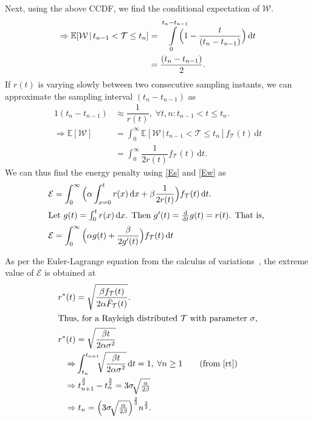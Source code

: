Next, using the above \ac{CCDF}, we find the conditional expectation of $\mathcal{W}$.
\begin{alignat*}{1}
\Rightarrow \mathbb{E}[\mathcal{W}\,|\,t_{n-1}<\mathcal{T}\leq t_n]&=\smashoperator[r]{\int_{0}^{t_n-t_{n-1}}}\Big(1-\dfrac{t}{(t_{n}-t_{n-1})}\Big)\,\mathrm{d}t\\
&=\dfrac{(t_n-t_{n-1})}{2}.
\end{alignat*}
If $r(t)$ is varying slowly between two consecutive sampling instants, we can approximate the sampling interval $(t_n\!-\!t_{n-1})$ as
\begin{alignat}{1}
 (t_n-t_{n-1})&\approx\dfrac{1}{r(t)},\;\forall t,n:t_{n-1}\!<\!t\!\leq\!t_n.\label{Apx3}\\
\Rightarrow \mathbb{E}[\mathcal{W}]&=\int_{0}^{\infty}\mathbb{E}[\mathcal{W}\,|\,t_{n-1}<\mathcal{T}\leq t_n]f_\mathcal{T}(t)\,\mathrm{d}t\nonumber\\
&=\int_{0}^{\infty}\dfrac{1}{2r(t)}f_\mathcal{T}(t)\,\mathrm{d}t.\label{Ew}
\end{alignat}
We can thus find the energy penalty using \cref{Es} and \cref{Ew} as
\begin{alignat*}{1}
\mathcal{E}&=\int_{0}^{\infty}\Big(\alpha\int_{x=0}^{t}r(x)\,\mathrm{d}x+\beta\dfrac{1}{2r(t)}\Big)f_{\mathcal{T}}(t)\,\mathrm{d}t.\label{epsilon_eulerForm}\\
\intertext{%
    Let $g(t)=\int_{0}^{t}r(x)\dif x$.
    Then  $g'(t)=\tfrac{\mathrm{d}}{\mathrm{d}t}g(t)=r(t)$.
    That is,
}
\mathcal{E}&=\int_{0}^{\infty}\Big(\alpha g(t)+\dfrac{\beta}{2g'(t)}\Big)f_{\mathcal{T}}(t)\,\mathrm{d}t
\end{alignat*}

As per the Euler-Lagrange equation from the calculus of variations~\cite{Bellman1954Dynamic,Arfken2015Calculus}, the extreme value of $\mathcal{E}$ is obtained at 
\begin{alignat}{1}
r^*(t)&=\sqrt{\dfrac{\beta f_\mathcal{T}(t)}{2\alpha\bar{F}_\mathcal{T}(t)}}.\\
\intertext{Thus, for a Rayleigh distributed $\mathcal{T}$ with parameter $\sigma$,}
r^*(t)&=\sqrt{\dfrac{\beta t}{2\alpha\sigma^2}}\\
\Rightarrow &\int_{t_n}^{t_{n+1}}\!\!\!\sqrt{\dfrac{\beta t}{2\alpha\sigma^2}}\,\mathrm{d}t=1,\;\forall n\geq1\nonumber\tag{from \eqref{rt}}\\
\Rightarrow &\;t_{n+1}^{\frac{3}{2}}-t_{n}^{\frac{3}{2}}=3\sigma\!\sqrt{\tfrac{\alpha}{2\beta}}\nonumber\\
\Rightarrow &\;t_n=\Big(3\sigma\!\sqrt{\tfrac{\alpha}{2\beta}}\Big)^{\frac{2}{3}}n^{\frac{2}{3}}\label{tnRayleigh}.
\end{alignat}

